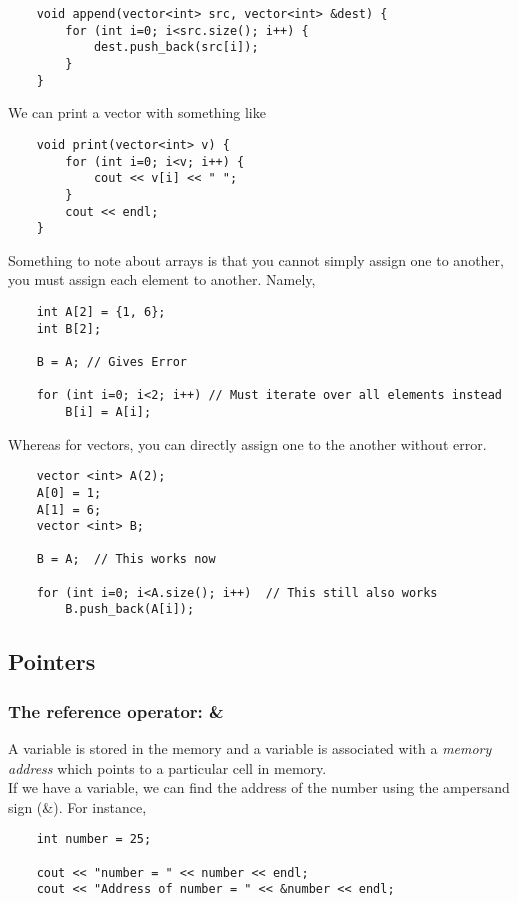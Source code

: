 \documentclass[]{article}
\begin{document}
\begin{lstlisting}
	void append(vector<int> src, vector<int> &dest) {
		for (int i=0; i<src.size(); i++) {
			dest.push_back(src[i]);
		}
	}
\end{lstlisting}\bigbreak

We can print a vector with something like

\begin{lstlisting}
	void print(vector<int> v) {
		for (int i=0; i<v; i++) {
			cout << v[i] << " ";
		}
		cout << endl;
	}
\end{lstlisting}\bigbreak

Something to note about arrays is that you cannot simply assign one to another, you must assign each element to another. Namely, 

\begin{lstlisting}
	int A[2] = {1, 6};
	int B[2];
	
	B = A; // Gives Error
	
	for (int i=0; i<2; i++)	// Must iterate over all elements instead
		B[i] = A[i];
\end{lstlisting}\bigbreak

Whereas for vectors, you can directly assign one to the another without error.

\begin{lstlisting}
	vector <int> A(2);
	A[0] = 1;
	A[1] = 6;
	vector <int> B;
	
	B = A; 	// This works now
	
	for (int i=0; i<A.size(); i++)	// This still also works
		B.push_back(A[i]);
\end{lstlisting}\bigbreak


\subsection{Pointers}
\bigbreak

\subsubsection{The reference operator: \&}
\bigbreak

A variable is stored in the memory and a variable is associated with a \textit{memory address} which points to a particular cell in memory.\\

If we have a variable, we can find the address of the number using the ampersand sign (\&). For instance,

\begin{lstlisting}
	int number = 25;
	
	cout << "number = " << number << endl;
	cout << "Address of number = " << &number << endl; 
\end{lstlisting}\bigbreak
\end{document}
